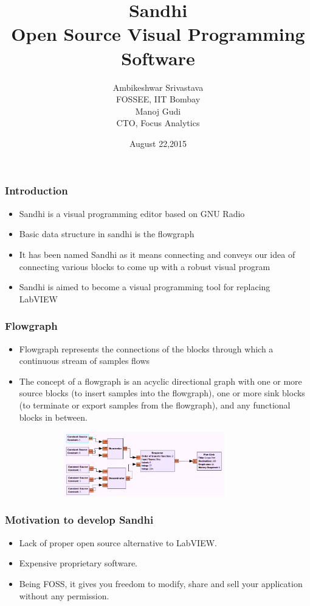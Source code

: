 \documentclass{beamer}
\title[Sandhi
\insertframenumber/\inserttotalframenumber]{Sandhi\\ Open Source Visual Programming Software}
\author[Sandhi Team, IIT Bombay]{Ambikeshwar Srivastava \\FOSSEE, IIT Bombay \\Manoj Gudi\\ CTO, Focus Analytics}
\date{August 22,2015}
\begin{document}
\begin{frame}
\titlepage
\end{frame}

\begin{frame}
	\frametitle{Introduction}
	\begin{itemize}
		\item Sandhi is a visual programming editor based on GNU Radio
		\item Basic data structure in sandhi is the flowgraph
		\item It has been named Sandhi as it means connecting and conveys our idea of connecting various blocks to come up with a robust visual program
		\item Sandhi is aimed to become a visual programming tool for replacing LabVIEW
	\end{itemize}
\end{frame}

\begin{frame}
        \frametitle{Flowgraph}
        \begin{itemize}
        \item Flowgraph represents the connections of the blocks through which a continuous stream of samples flows
        \item The concept of a flowgraph is an acyclic directional graph with one or more source blocks (to insert samples into the flowgraph), one or more sink blocks (to terminate or export samples from the flowgraph), and any functional blocks in between.
        \end{itemize}
	\vspace{-0.14in}
        \begin{figure}
        \centering
        \includegraphics[height=2.8cm, width=10cm]{step_resp.png}
        \end{figure}
        \vspace{-0.2in}

\end{frame}

\begin{frame}
        \frametitle{Motivation to develop Sandhi}
        \begin{itemize}
		\item Lack of proper open source alternative to LabVIEW.
		\item  Expensive proprietary software.
		\item  Being FOSS, it gives you freedom to modify, share and sell your application without any permission. 
        \end{itemize}
\end{frame}
\end{document}

